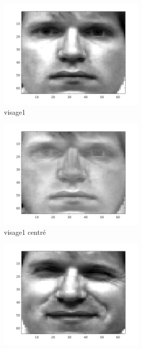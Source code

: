 \documentclass[a4paper]{article}
\begin{document}
\begin{figure}[H]
    \begin{subfigure}[c]{0.24\textwidth}
        \centering
        \includegraphics[width=0.8\textwidth]{images/ex1_x1.png}
        \caption{visage1}
        \label{subfig:ex1_x1}
    \end{subfigure}
    \begin{subfigure}[c]{0.24\textwidth}
        \centering
        \includegraphics[width=0.8\textwidth]{images/ex1_x1c.png}
        \caption{visage1 centré}
        \label{subfig:ex1_x1c}
    \end{subfigure}
    \begin{subfigure}[c]{0.24\textwidth}
        \centering
        \includegraphics[width=0.8\textwidth]{images/ex1_x2.png}

\end{subfigure}
\end{figure}
\end{document}
